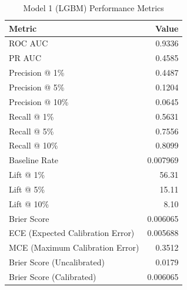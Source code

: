 \begin{table}[h]
\centering
\begin{tabular}{lr}
\toprule
Metric & Value \\
\midrule
ROC AUC & 0.9336 \\
PR AUC & 0.4585 \\
Precision @ 1\% & 0.4487 \\
Precision @ 5\% & 0.1204 \\
Precision @ 10\% & 0.0645 \\
Recall @ 1\% & 0.5631 \\
Recall @ 5\% & 0.7556 \\
Recall @ 10\% & 0.8099 \\
Baseline Rate & 0.007969 \\
Lift @ 1\% & 56.31 \\
Lift @ 5\% & 15.11 \\
Lift @ 10\% & 8.10 \\
Brier Score & 0.006065 \\
ECE (Expected Calibration Error) & 0.005688 \\
MCE (Maximum Calibration Error) & 0.3512 \\
Brier Score (Uncalibrated) & 0.0179 \\
Brier Score (Calibrated) & 0.006065 \\
\bottomrule
\end{tabular}
\caption{Model 1 (LGBM) Performance Metrics}
\label{tab:model1_lgbm_metrics}
\end{table}
